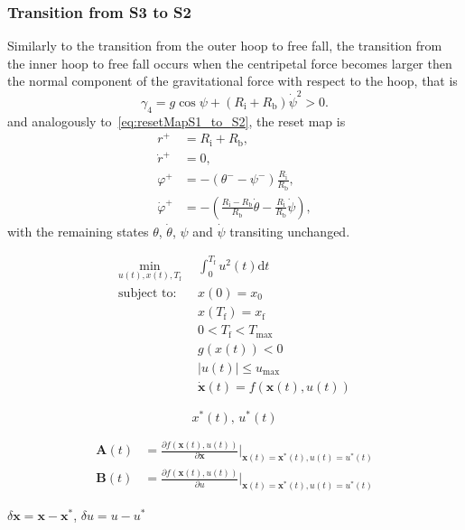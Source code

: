 \documentclass{ifacconf}
\begin{document}
\subsubsection{Transition from S3 to S2} %
Similarly to the transition from the outer hoop to free fall, the transition from the inner hoop to free fall occurs when the centripetal force becomes larger then the normal component of the gravitational force with respect to the hoop, that is
$$
  \gamma_4 = g\cos{\psi} + \left(R_\mathrm{i} + R_\mathrm{b}\right)\dot{\psi}^2 > 0.
$$
and analogously to~\eqref{eq:resetMapS1_to_S2}, the reset map is
\begin{subequations}
\label{eq:resetMapS3_to_S2}
\begin{align}
  r^+            &= R_\mathrm{i}+R_\mathrm{b}, \\
  \dot{r}^+      &=   0, \\
  \varphi^+      &=   -(\theta^- - \psi^-)\frac{R_\mathrm{i}}{R_\mathrm{b}}, \\
  \dot{\varphi}^+  &=   -\left(\frac{R_\mathrm{i}-R_\mathrm{b}}{R_\mathrm{b}}\dot{\theta} - \frac{R_\mathrm{i}}{R_\mathrm{b}}\dot{\psi}\right),
\end{align}
\end{subequations}
with the remaining states $\theta$, $\dot{\theta}$, $\psi$ and $\dot{\psi}$ transiting unchanged.

\begin{align}
\label{eq:rollIt_OCP}
  \min_{u(t), x(t),T_\mathrm{f}} &\,\,\,  \int_{0}^{T_\mathrm{f}} u^2(t) \mathrm{d}t \\
 \nonumber       \text{subject to:}\,     &\,\,\, x(0) = x_0 \\
 \nonumber                          &\,\,\, x(T_\mathrm{f})  = x_\mathrm{f} \\
 \nonumber                          &\,\,\, 0 < T_\mathrm{f} < T_\mathrm{max} \\
 \nonumber                          &\,\,\, g\left(\mathbf{}{x}(t)\right) < 0 \\
 \nonumber                          &\,\,\, |u(t)| \leq u_\mathrm{max} \\
 \nonumber                          &\,\,\, \dot{\mathbf{x}}(t) = f(\mathbf{x}(t), u(t))
\end{align}


\begin{equation}
  x^\ast(t),\, u^\ast(t)
\end{equation}

\begin{align}
  \mathbf{A}(t) &= \frac{\partial f \left(\mathbf{x}(t), u(t)\right)}{\partial \mathbf{x}}\Big|_{\mathbf{x}(t) = \mathbf{x}^\ast(t), u(t)=u^\ast(t)} \\
  \mathbf{B}(t) &= \frac{\partial f \left(\mathbf{x}(t), u(t)\right)}{\partial u}\Big|_{\mathbf{x}(t) = \mathbf{x}^\ast(t), u(t)=u^\ast(t)}
\end{align}

$\delta\mathbf{x} = \mathbf{x} - \mathbf{x}^\ast$, $\delta u = u - u^\ast$


\end{document}
